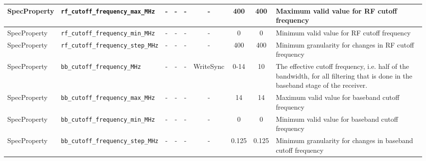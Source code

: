 \documentclass{article}
\begin{document}
\begin{landscape}
\begin{scriptsize}
\begin{tabular}{|p{2cm}|p{4cm}|c|c|c|c|c|c|p{6.5cm}|}
			SpecProperty & \verb+rf_cutoff_frequency_max_MHz+  & -    & -        & -          & -              & 400          & 400     & Maximum valid value for RF cutoff frequency                                                                                                                                                                                 \\
			\hline
			SpecProperty & \verb+rf_cutoff_frequency_min_MHz+  & -    & -        & -          & -              & 0            & 0       & Minimum valid value for RF cutoff frequency                                                                                                                                                                                 \\
			\hline
			SpecProperty & \verb+rf_cutoff_frequency_step_MHz+ & -    & -        & -          & -              & 400          & 400     & Minimum granularity for changes in RF cutoff frequency                                                                                                                                                                      \\
			\hline
			SpecProperty & \verb+bb_cutoff_frequency_MHz+      & -    & -        & -          & WriteSync      & 0-14         & 10      & The effective cutoff frequency, i.e. half of the bandwidth, for all filtering that is done in the baseband stage of the receiver.                                                                                                                                  \\
			\hline
			SpecProperty & \verb+bb_cutoff_frequency_max_MHz+  & -    & -        & -          & -              & 14           & 14      & Maximum valid value for baseband cutoff frequency                                                                                                                                                                           \\
			\hline
			SpecProperty & \verb+bb_cutoff_frequency_min_MHz+  & -    & -        & -          & -              & 0            & 0       & Minimum valid value for baseband cutoff frequency                                                                                                                                                                           \\
			\hline
			SpecProperty & \verb+bb_cutoff_frequency_step_MHz+ & -    & -        & -          & -              & 0.125        & 0.125   & Minimum granularity for changes in baseband cutoff frequency                                                                                                                                                                \\
			\hline
		\end{tabular}
	\end{scriptsize}
\end{landscape}
\end{document}
